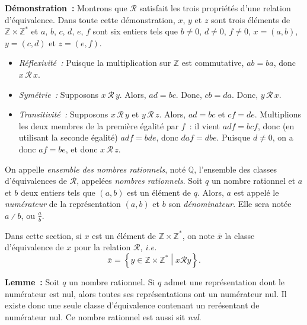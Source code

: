 \noindent\textbf{Démonstration :} Montrons que $\mathcal{R}$ satisfait les trois propriétés d'une relation d'équivalence.
    Dans toute cette démonstration, $x$, $y$ et $z$ sont trois éléments de $\mathbb{Z} \times \mathbb{Z}^*$ et $a$, $b$, $c$, $d$, $e$, $f$ sont six entiers tels que $b \neq 0$, $d \neq 0$, $f \neq 0$, $x = (a, b)$, $y = (c, d)$ et $z = (e, f)$.
    \begin{itemize}[nosep]
        \item \textit{Réflexivité :} Puisque la multiplication sur $\mathbb{Z}$ est commutative, $a b = b a$, donc $x \, \mathcal{R} \, x$.
        \item \textit{Symétrie :} Supposons $x \, \mathcal{R} \, y$. 
            Alors, $a d = b c$.
            Donc, $c b = d a$.
            Donc, $y \, \mathcal{R} \, x$.
        \item \textit{Transitivité :} Supposons $x \, \mathcal{R} \, y$ et $y \, \mathcal{R} \, z$.
            Alors, $a d = b c$ et $c f = d e$.
            Multiplions les deux membres de la première égalité par $f$ : il vient $a d f = b c f$, donc (en utilisant la seconde égalité) $a d f = b d e$, donc $d a f = d b e$.
            Puisque $d \neq 0$, on a donc $a f = b e$, et donc $x \, \mathcal{R} \, z$.
    \end{itemize}
    
    \done

\medskip

On appelle \emph{ensemble des nombres rationnels}, noté $\mathbb{Q}$, l'ensemble des classes d'équivalences de $\mathcal{R}$, appelées \emph{nombres rationnels}. 
 
Soit $q$ un nombre rationnel et $a$ et $b$ deux entiers tels que $(a, b)$ est un élément de $q$. 
Alors, $a$ est appelé le \emph{numérateur} de la représentation $(a, b)$ et $b$ son \emph{dénominateur}.
 
Elle sera notée $a \divslash b$, ou $\frac{a}{b}$.

Dans cette section, si $x$ est un élément de $\mathbb{Z} \times \mathbb{Z}^*$, on note $\bar{x}$ la classe d'équivalence de $x$ pour la relation $\mathcal{R}$, \emph{i.e.}
\begin{equation*}
    \bar{x} = \left\lbrace y \in \mathbb{Z} \times \mathbb{Z}^* \middle\vert x \mathrel{\mathcal{R}} y \right\rbrace .
\end{equation*}

\medskip

\noindent\textbf{Lemme :} Soit $q$ un nombre rationnel. 
Si $q$ admet une représentation dont le numérateur est nul, alors toutes ses représentations ont un numérateur nul. 
Il existe donc une seule classe d'équivalence contenant un rerésentant de numérateur nul. 
Ce nombre rationnel est aussi sit \emph{nul}.

